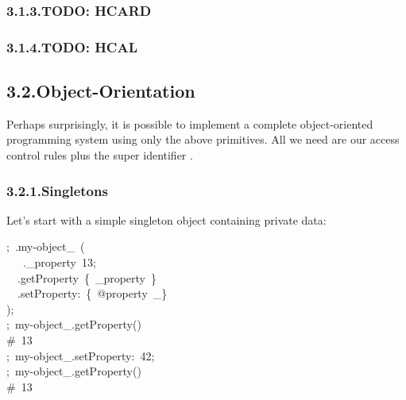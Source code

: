 \documentclass[preprint]{{acmart}}
\begin{document}
\subsubsection{3.1.3.\hspace*{0.5em}TODO: HCARD}\label{sec-todo--hcard}%

\subsubsection{3.1.4.\hspace*{0.5em}TODO: HCAL}\label{sec-todo--hcal}%

\subsection{3.2.\hspace*{0.5em}Object-Orientation}\label{sec-object-orientation}%

\noindent{}Perhaps surprisingly, it is possible to implement a complete object-oriented
programming system using only the above primitives.  All we need
are our access control rules plus the super identifier \mdcode{\_\textasciicircum{}}.%

\subsubsection{3.2.1.\hspace*{0.5em}Singletons}\label{sec-singletons}%

\noindent{}Let's start with a simple singleton object containing private data:%
\begin{mdpre}%
\noindent;~.my-object\_~(\\
~~~.\_property~{13};\\
~~.getProperty~\{~\_property~\}\\
~~.setProperty{:}~\{~{@property}~\_\}\\
);\\
;~my-object\_.getProperty()\\
{\#~13}\\
;~my-object\_.setProperty{:}~{42};\\
;~my-object\_.getProperty()\\
{\#~13}%
\end{mdpre}
\end{document}
